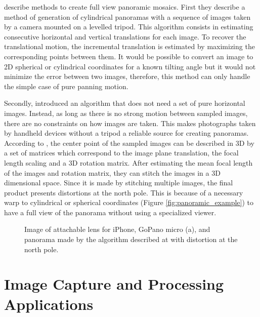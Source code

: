 \citeauthor{szeliski1997creating} \cite{szeliski1997creating} describe methods to create full view panoramic mosaics. First they describe a method of generation of cylindrical panoramas with a sequence of images taken by a camera mounted on a levelled tripod. This algorithm consists in estimating consecutive horizontal and vertical translations for each image. To recover the translational motion, the incremental translation is estimated by maximizing the corresponding points between them. It would be possible to convert an image to 2D spherical or cylindrical coordinates for a known tilting angle but it would not minimize the error between two images, therefore, this method can only handle the simple case of pure panning motion.

Secondly, \citeauthor{szeliski1997creating} \cite{szeliski1997creating} introduced an algorithm that does not need a set of pure horizontal images. Instead, as long as there is no strong motion between sampled images, there are no constraints on how images are taken. This makes photographs taken by handheld devices without a tripod a reliable source for creating panoramas. According to \citeauthor{szeliski1997creating}, the center point of the sampled images can be described in 3D by a set of matrices which correspond to the image plane translation, the focal length scaling and a 3D rotation matrix. After estimating the mean focal length of the images and rotation matrix, they can stitch the images in a 3D dimensional space.
Since it is made by stitching multiple images, the final product presents distortions at the north pole. This is because of a necessary warp to cylindrical or spherical coordinates (Figure \ref{fig:panoramic_example}) to have a full view of the panorama without using a specialized viewer.

\begin{figure}[htbp]
        \centering
  \caption{Image of attachable lens for iPhone, GoPano micro (a), and panorama made by the algorithm described at \citeauthor{szeliski1997creating} \cite{szeliski1997creating} with distortion at the north pole.}
  \label{fig:panoramic_image}
\end{figure}


\section{Image Capture and Processing Applications}
\label{sub:capturing_processing}

